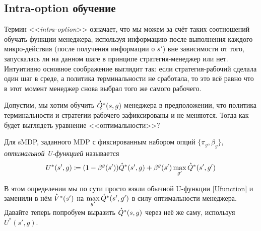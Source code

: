 
\subsection{Intra-option обучение}

Термин <<\emph{intra-option}>> означает, что мы можем за счёт таких соотношений обучать функции менеджера, используя информацию после выполнения каждого микро-действия (после получения информации о $s'$) вне зависимости от того, запускалась ли на данном шаге в принципе стратегия-менеджер или нет. Интуитивно основное соображение выглядит так: если стратегия-рабочий сделала один шаг в среде, а политика терминальности не сработала, то это всё равно что в этот момент менеджер снова выбрал того же самого рабочего.

Допустим, мы хотим обучить $\accentset{\star}{Q}^*(s, g)$ менеджера в предположении, что политика терминальности и стратегии рабочего зафиксированы и не меняются. Тогда как будет выглядеть уравнение <<оптимальности>>?

\begin{definition}
Для sMDP, заданного MDP с фиксированным набором опций $\{\pi_g, \beta_g\}$, \emph{оптимальной U-функцией} называется
\begin{equation}\label{U*function}
U^*(s', g) \coloneqq (1 - \beta^g(s'))\accentset{\star}{Q}^*(s', g) + \beta^g(s') \max\limits_{g'} \accentset{\star}{Q}^*(s', g')
\end{equation}
\end{definition}

В этом определении мы по сути просто взяли обычной U-функции \eqref{Ufunction} и заменили в нём $\accentset{\star}{V}^*(s')$ на $\max\limits_{g'} \accentset{\star}{Q}^*(s', g')$ в силу оптимальности менеджера. Давайте теперь попробуем выразить $\accentset{\star}{Q}^*(s, g)$ через неё же саму, используя $U^*(s', g)$.

